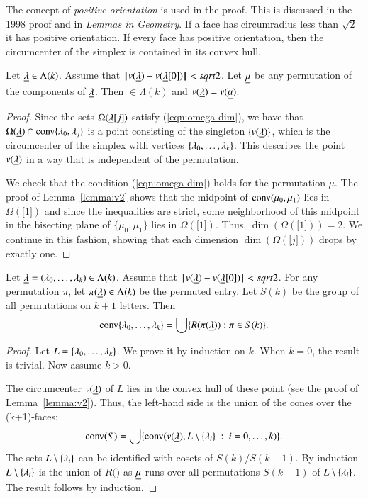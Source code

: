 \begin{note}%
The concept of {\it positive orientation} is used in the proof.  This is discussed in the 1998 proof and in {\it Lemmas in Geometry}.  If a face has circumradius less than $\sqrt2$ it has positive orientation.  If every face has positive orientation, then the circumcenter of the simplex is contained in its convex hull.
\end{note}

\begin{lemma}   Let ${\underline{\lambda}}\in\Lambda(k)$.  Assume that ${\hskip0.1em|\hskip-0.15em|\hskip0.1em}v({\underline{\lambda}}) - v({\underline{\lambda}}[0]){\hskip0.1em|\hskip-0.15em|\hskip0.1em}<sqrt2$.
Let ${\underline{\mu}}$ be any permutation of the components of ${\underline{\lambda}}$.  Then $\bm\in\Lambda(k)$ and
 $v({\underline{\lambda}}) = v({\underline{\mu}})$.
\end{lemma}

\begin{proof} 
Since the sets $\Omega({\underline{\lambda}}[j])$ satisfy (\ref{eqn:omega-dim}), we have that
$\Omega({\underline{\lambda}})\cap {\operatorname{conv}}\{\lambda_0,\lambda_j\}$ is a point consisting of the singleton $\{v({\underline{\lambda}})\}$, which is the
circumcenter of the simplex with vertices $\{\lambda_0,\ldots,\lambda_k\}$.  This describes
the point $v({\underline{\lambda}})$ in a way that is independent of the permutation.

We check that the condition (\ref{eqn:omega-dim}) holds for the permutation $\mu$.
The proof of Lemma~\ref{lemma:v2} shows that the midpoint of ${\operatorname{conv}}(\mu_0,\mu_1)$
lies in $\Omega(\bm[1])$ and since the inequalities are strict, some neighborhood
of this midpoint in the bisecting plane of $\{\mu_0,\mu_1\}$ lies in $\Omega(\bm[1])$.
Thus, $\dim(\Omega(\bm[1]))=2$.  We continue in this fashion, showing that each dimension
$\dim(\Omega(\bm[j]))$ drops by exactly one.
\end{proof}

\begin{lemma}\label{lemma:Rconv} Let ${\underline{\lambda}} = (\lambda_0,\ldots,\lambda_k)\in\Lambda(k)$.  Assume that ${\hskip0.1em|\hskip-0.15em|\hskip0.1em}v({\underline{\lambda}}) - v({\underline{\lambda}}[0]){\hskip0.1em|\hskip-0.15em|\hskip0.1em}<sqrt2$.
For any permutation $\pi$, let $\pi({\underline{\lambda}})\in\Lambda(k)$ be the permuted entry.  Let
$S(k)$ be the group of all permutations on $k+1$ letters.   Then
$$
{\operatorname{conv}}\{\lambda_0,\ldots,\lambda_k\} = \bigcup \{ R(\pi({\underline{\lambda}})) : \pi\in S(k)\}.
$$
\end{lemma}

\begin{proof} Let $L = \{\lambda_0,\ldots,\lambda_k\}$.  We prove it by induction on $k$.
When $k=0$, the result is trivial.  Now assume $k>0$.

The circumcenter $v({\underline{\lambda}})$ of $L$ lies in the convex hull of these
point (see the proof of Lemma~\ref{lemma:v2}).  Thus, the left-hand side is the union
of the cones over the (k+1)-faces:
$$
{\operatorname{conv}}(S) = \bigcup\{ {\operatorname{conv}}(v({\underline{\lambda}}),L\setminus \{\lambda_i\}\ :\  i=0,\ldots,k) \}.
$$
The sets $L\setminus \{\lambda_i\}$ can be identified with  cosets of $S(k)/S(k-1)$.
By induction $L\setminus \{\lambda_i\}$ is the union of $R(\bm)$ as ${\underline{\mu}}$ runs
over all permutations $S(k-1)$ of $L\setminus \{\lambda_i\}$.
The result follows by induction.
\end{proof}

